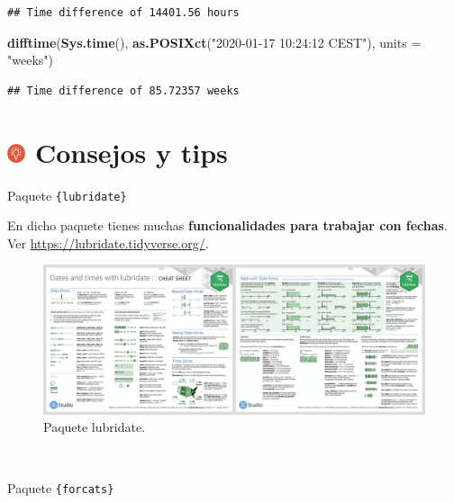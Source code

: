 \documentclass[11pt,]{book}
\newenvironment{Shaded}{\begin{snugshade}}{\end{snugshade}}
\newcommand{\DataTypeTok}[1]{\textcolor[rgb]{0.27,0.27,0.27}{#1}}
\newcommand{\KeywordTok}[1]{\textcolor[rgb]{0.27,0.27,0.27}{\textbf{#1}}}
\newcommand{\NormalTok}[1]{#1}
\newcommand{\StringTok}[1]{\textcolor[rgb]{0.5,0.5,0.5}{#1}}
\begin{document}
\begin{verbatim}
## Time difference of 14401.56 hours
\end{verbatim}

\begin{Shaded}
\begin{Highlighting}[]
\KeywordTok{difftime}\NormalTok{(}\KeywordTok{Sys.time}\NormalTok{(), }\KeywordTok{as.POSIXct}\NormalTok{(}\StringTok{"2020-01-17 10:24:12 CEST"}\NormalTok{), }\DataTypeTok{units =} \StringTok{"weeks"}\NormalTok{)}
\end{Highlighting}
\end{Shaded}

\begin{verbatim}
## Time difference of 85.72357 weeks
\end{verbatim}

\hypertarget{consejos-y-tips-7}{%
\section[ Consejos y tips]{\texorpdfstring{\protect\includegraphics[width=0.04\textwidth,height=\textheight]{img/logo_info.png} Consejos y tips}{ Consejos y tips}}\label{consejos-y-tips-7}}

Paquete \texttt{\{lubridate\}}

En dicho paquete tienes muchas \textbf{funcionalidades para trabajar con fechas}. Ver \url{https://lubridate.tidyverse.org/}.

\begin{figure}

{\centering \includegraphics[width=0.95\linewidth]{./img/lubridate} 

}

\caption{Paquete lubridate.}\label{fig:lubridate}
\end{figure}

~

Paquete \texttt{\{forcats\}}
\end{document}
